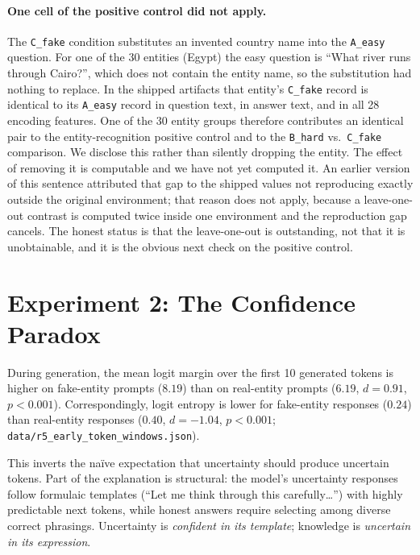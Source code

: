 \documentclass[11pt,a4paper]{article}
\begin{document}
\paragraph{One cell of the positive control did not apply.} The
\texttt{C\_fake} condition substitutes an invented country name into the
\texttt{A\_easy} question. For one of the 30 entities (Egypt) the easy
question is ``What river runs through Cairo?'', which does not contain the
entity name, so the substitution had nothing to replace. In the shipped
artifacts that entity's \texttt{C\_fake} record is identical to its
\texttt{A\_easy} record in question text, in answer text, and in all 28
encoding features. One of the 30 entity groups therefore contributes an
identical pair to the entity-recognition positive control and to the
\texttt{B\_hard} vs.\ \texttt{C\_fake} comparison. We disclose this rather
than silently dropping the entity. The effect of removing it is
computable and we have not yet computed it. An earlier version of this
sentence attributed that gap to the shipped values not reproducing exactly
outside the original environment; that reason does not apply, because a
leave-one-out contrast is computed twice inside one environment and the
reproduction gap cancels. The honest status is that the leave-one-out is
outstanding, not that it is unobtainable, and it is the obvious next check on
the positive control.

\section{Experiment 2: The Confidence Paradox}
\label{sec:confidence}

During generation, the mean logit margin over the first 10 generated tokens is higher on fake-entity prompts ($8.19$) than on real-entity prompts
($6.19$, $d{=}0.91$, $p{<}0.001$). Correspondingly, logit
entropy is lower for fake-entity responses ($0.24$) than
real-entity responses ($0.40$, $d{=}-1.04$, $p{<}0.001$; \texttt{data/r5\_early\_token\_windows.json}).

This inverts the na\"ive expectation that uncertainty should produce
uncertain tokens. Part of the explanation is structural: the model's uncertainty
responses follow formulaic templates (``Let me think through this
carefully\ldots'') with highly predictable next tokens, while honest
answers require selecting among diverse correct phrasings. Uncertainty is
\emph{confident in its template}; knowledge is \emph{uncertain in its
expression}.
\end{document}
